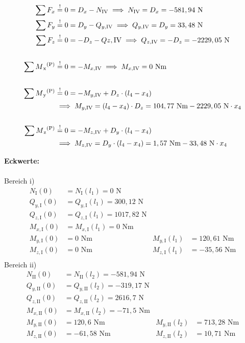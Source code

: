 \begin{enumerate}
\begin{center}
\end{center}
\begin{align*}
	\sum F_x &\overset{!}{=} 0 = D_x - N_{\mathrm{IV}} 
		\implies  N_{\mathrm{IV}} = D_x = -581,94 \text { N}\\ 
	\sum F_y &\overset{!}{=} 0 =D_y - Q_{y,\mathrm{IV}}
		\implies Q_{y,\mathrm{IV}} = D_y = 33,48 \text{ N}\\ 
	\sum F_z &\overset{!}{=} 0 = -D_z -Q{z,\mathrm{IV}} 
		\implies Q_{z,\mathrm{IV}} = -D_z = -2229,05 \text{ N} \\ \\
	\sum M\textsubscript{x}\textsuperscript{(P)} &\overset{!}{=} 0 =- M_{x,\mathrm{IV}}  
		\implies M_{x,\mathrm{IV}} = 0 \text{ Nm} \\ \\
	\sum M\textsubscript{y}\textsuperscript{(P)} &\overset{!}{=} 0 =- M_{y,\mathrm{IV}} + D_z \cdot  (l_4 - x_4) \\
		&\implies M_{y,\mathrm{IV}} =  (l_4 - x_4) \cdot D_z =104,77\text{ Nm} - 2229,05 \text{ N} \cdot x_4\\ \\
	\sum M\textsubscript{z}\textsuperscript{(P)} &\overset{!}{=} 0 = - M_{z,\mathrm{IV}} + D_y \cdot  (l_4 - x_4)  \\
		&\implies  M_{z,\mathrm{IV}} =  D_y \cdot (l_4 - x_4) = 1,57 \text{ Nm} -33,48 \text{ N} \cdot x_4
	\end{align*}
\end{enumerate}
\newpage
\textbf{Eckwerte:}\\ \\
Bereich i)
\begin{align*}
	N_{\mathrm{I}} (0) &= N_{\mathrm{I}} (l_1) = 0 \text{ N}\\
	Q_{y,\mathrm{I}} (0) &= Q_{y,\mathrm{I}} (l_1) = 300,12\text{ N}\\
	Q_{z,\mathrm{I}} (0) &= Q_{z,\mathrm{I}} (l_1) = 1017,82\text{ N}\\
	M_{x,\mathrm{I}} (0) &=  M_{x,\mathrm{I}} (l_1) = 0\text{ Nm}\\
	M_{y,\mathrm{I}} (0) &=  0\text{ Nm} & M_{y,\mathrm{I}} (l_1) &= 120,61\text{ Nm}\\
	M_{z,\mathrm{I}} (0) &= 0\text{ Nm} & M_{z,\mathrm{I}} (l_1) &= -35,56\text{ Nm}\\
\end{align*}
Bereich ii)
\begin{align*}
	N_{\mathrm{II}} (0) &= N_{\mathrm{II}} (l_2) = -581,94 \text{ N}\\
	Q_{y,\mathrm{II}} (0) &= Q_{y,\mathrm{II}} (l_2) =-319,17\text{ N}\\
	Q_{z,\mathrm{II}} (0) &= Q_{z,\mathrm{II}} (l_2) = 2616,7\text{ N}\\
	M_{x,\mathrm{II}} (0) &= M_{x,\mathrm{II}} (l_2) = -71,5\text{ Nm}\\
	M_{y,\mathrm{II}} (0) &=  120,6\text{ Nm} & M_{y,\mathrm{II}} (l_2) &= 713,28\text{ Nm}\\
	M_{z,\mathrm{II}} (0) &=  -61,58\text{ Nm} &M_{z,\mathrm{II}} (l_2) &= 10,71\text{ Nm}\\
\end{align*}
